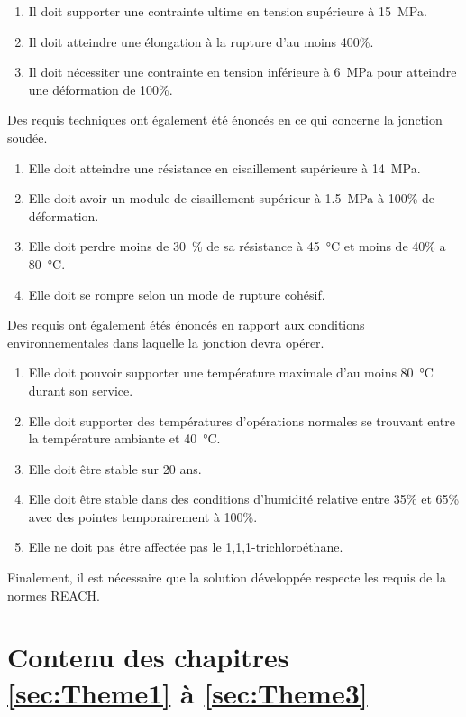 \begin{enumerate}
	\item Il doit supporter une contrainte ultime en tension supérieure à \SI{15}{\mega\pascal}. 
	\item Il doit atteindre une élongation à la rupture d'au moins 400\%. 
	\item Il doit nécessiter une contrainte en tension inférieure à \SI{6}{\mega\pascal} pour atteindre une déformation de 100\%. 
\end{enumerate}

Des requis techniques ont également été énoncés en ce qui concerne la jonction soudée. 

\begin{enumerate}
	\item Elle doit atteindre une résistance en cisaillement supérieure à \SI{14}{\mega\pascal}. 
	\item Elle doit avoir un module de cisaillement supérieur à \SI{1.5}{\mega\pascal} à 100\% de déformation. 
	\item Elle doit perdre moins de 30 \% de sa résistance à \SI{45}{\celsius} et moins de 40\% a \SI{80}{\celsius}. 
	\item Elle doit se rompre selon un mode de rupture cohésif. 
\end{enumerate}

Des requis ont également étés énoncés en rapport aux conditions environnementales dans laquelle la jonction devra opérer. 

\begin{enumerate}
	\item Elle doit pouvoir supporter une température maximale d'au moins \SI{80}{\celsius} durant son service. 
	\item Elle doit supporter des températures d'opérations normales se trouvant entre la température ambiante et \SI{40}{\celsius}. 
	\item Elle doit être stable sur 20 ans. 
	\item Elle doit être stable dans des conditions d'humidité relative entre 35\% et 65\% avec des pointes temporairement à 100\%. 
	\item Elle ne doit pas être affectée pas le 1,1,1-trichloroéthane. 
\end{enumerate}

Finalement, il est nécessaire que la solution développée respecte les requis de la normes REACH. 

\section{Contenu des chapitres \ref{sec:Theme1} à \ref{sec:Theme3}}

